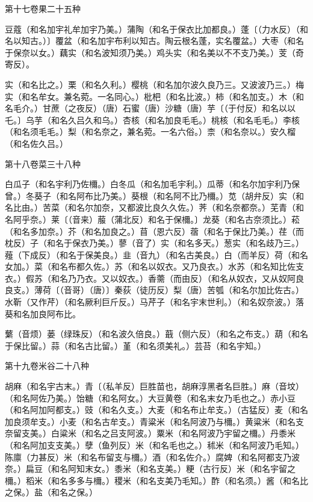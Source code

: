 \documentclass[a4paper,12pt,UTF8,twoside]{ctexbook}
\begin{document}
第十七卷果二十五种

豆蔻（和名加宇礼牟加宇乃美。）蒲陶（和名于保衣比加都良。）蓬〔（力水反）（和名以知古。）〕覆盆（和名加宇布利以知古。陶云根名蓬，实名覆盆。）大枣（和名于保奈以女。）藕实（和名波知须乃美。）鸡头实（和名美以不不支乃美。）芰（奇寄反）。

实（和名比之。）栗（和名久利。）樱桃（和名加尔波久良乃三。又波波乃三。）梅实（和名牟女。兼名菀。一名同心。）枇杷（和名比波。）柿（和名加支。）木（和名毛介。）甘蔗（之夜反）（唐）石蜜（唐）沙糖（唐）芋〔（于付反）和名以以乇。〕乌芋（和名久吕久和乌。）杏核（和名加良毛毛。）桃核（和名毛毛。）李核（和名须毛毛。）梨（和名奈之，兼名菀。一名六俗。）柰（和名奈以。）安久榴（和名佐久吕。）

第十八卷菜三十八种

白瓜子（和名宇利乃佐檷。）白冬瓜（和名加毛宇利。）瓜蒂（和名尔加宇利乃保曾。）冬葵子（和名阿布比乃美。）葵根（和名阿不比乃檷。）苋（胡弁反）实（和名比由。）苦菜（和名尔加奈，又都波比良久久佐。）荠（和名奈都奈。）芜青（和名阿乎奈。）莱〔（音来）菔（蒲北反）和名于保檷。〕龙葵（和名古奈须比。）菘（和名多加奈。）芥（和名加良之。）苜（恩六反）蓿（和名于保比乃美。）荏（而枕反）子（和名于保衣乃美。）蓼（音了）实（和名多天。）葱实（和名歧乃三。）薤（下成反）（和名于保美良。）韭（音九）（和名古美良。）白（而羊反）荷（和名女加。）菜（和名布都久佐。）苏（和名以奴衣。又乃良衣。）水苏（和名知比佐支衣。）假苏（和名乃乃衣。又以奴衣。）香薷（而由反）（和名从奴衣，又从奴阿良良支。）薄荷〔（音哥）（唐）〕秦荻（徒历反）梨（唐）苦瓠（和名尔加比佐古。）水靳（又作芹）（和名厥利巨斤反。）马芹子（和名宇末世利。）（和名奴奈波。）落葵和名加良阿布比。

蘩（音烦）蒌（绿珠反）（和名波久倍良。）蕺（侧六反）（和名之布支。）葫（和名于保比留。）蒜（和名古比留。）堇（和名须美礼。）芸苔（和名宇知。）

第十九卷米谷二十八种

胡麻（和名宇古末。）青〔（私羊反）巨胜苗也，胡麻淳黑者名巨胜。〕麻（音坟）（和名阿佐乃美。）饴糖（和名阿女。）大豆黄卷（和名末女乃毛也之。）赤小豆（和名阿加阿都支。）豉（和名久支。）大麦（和名布止牟支。）（古猛反）麦（和名加良须牟支。）小麦（和名古牟支。）青粱米（和名阿波乃与檷。）黄粱米（和名支奈留支美。）白粱米（和名之吕支阿波。）粟米（和名阿波乃宇留之檷。）丹黍米（和名阿加支支美。）孽（鱼列反）米（和名毛也之。）秫米（和名阿波乃毛知。）陈廪（力甚反）米（和名布留支与檷。）酒（和名佐介。）腐婢（和名阿都支乃波奈。）扁豆（和名阿知末女。）黍米（和名支美。）粳（古行反）米（和名宇留之檷。）稻米（和名多多与檷。）稷米（和名支美乃毛知。）酢（和名须。）酱（和名比之保。）盐（和名之保。）
\end{document}

